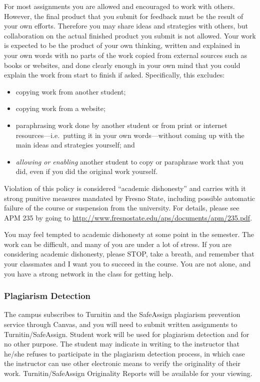 For most assignments you are allowed and encouraged to work with others.
However, the final product that you submit for feedback must be the
result of your own efforts. Therefore you may share ideas and strategies
with others, but collaboration on the actual finished product you submit
is not allowed. Your work is expected to be the product of your own
thinking, written and explained in your own words with no parts of the
work copied from external sources such as books or websites, and done
clearly enough in your own mind that you could explain the work from
start to finish if asked. Specifically, this excludes:

\begin{itemize}
\tightlist
\item
  copying work from another student;
\item
  copying work from a website;
\item
  paraphrasing work done by another student or from print or internet
  resources---i.e.~putting it in your own words---without coming up with
  the main ideas and strategies yourself; and
\item
  \emph{allowing or enabling} another student to copy or paraphrase work
  that you did, even if you did the original work yourself.
\end{itemize}

Violation of this policy is considered ``academic dishonesty'' and
carries with it strong punitive measures mandated by Fresno State,
including possible automatic failure of the course or suspension from
the university. For details, please see APM 235 by going to
\url{http://www.fresnostate.edu/aps/documents/apm/235.pdf}.

You may feel tempted to academic dishonesty at some point in the
semester. The work can be difficult, and many of you are under a lot of
stress. If you are considering academic dishonesty, please STOP, take a
breath, and remember that your classmates and I want you to succeed in
the course. You are not alone, and you have a strong network in the
class for getting help.

\hypertarget{plagiarism-detection}{%
\subsubsection{Plagiarism Detection}\label{plagiarism-detection}}

The campus subscribes to Turnitin and the SafeAssign plagiarism
prevention service through Canvas, and you will need to submit written
assignments to Turnitin/SafeAssign. Student work will be used for
plagiarism detection and for no other purpose. The student may indicate
in writing to the instructor that he/she refuses to participate in the
plagiarism detection process, in which case the instructor can use other
electronic means to verify the originality of their work.
Turnitin/SafeAssign Originality Reports will be available for your
viewing.

